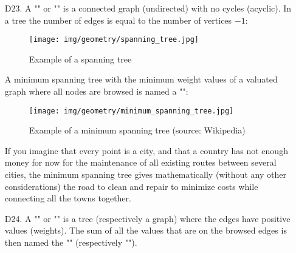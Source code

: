 {\begin{enumerate}
	\item[D23.] A "" or "" is a connected graph (undirected) with no cycles (acyclic). In a tree the number of edges is equal to the number of vertices $- 1$:
	 \begin{figure}[H]
		\centering
		\texttt{[image: img/geometry/spanning\_tree.jpg]}
		\caption{Example of a spanning tree}
	\end{figure}
	 A minimum spanning tree with the minimum weight values of a valuated graph where all nodes are browsed is named a "":
	 \begin{figure}[H]
		\centering
		\texttt{[image: img/geometry/minimum\_spanning\_tree.jpg]}
		\caption[Example of a minimum spanning tree]{Example of a minimum spanning tree (source: Wikipedia)}
	\end{figure}
	If you imagine that every point is a city, and that a country has not enough money for now for the maintenance of all existing routes between several cities, the minimum spanning tree gives mathematically (without any other considerations) the road to clean and repair to minimize costs while connecting all the towns together.
	
	\item[D24.] A "" or "" is a tree (respectively a graph) where the edges have positive values (weights). The sum of all the values that are on the browsed edges is then named the "" (respectively "").
	

\end{enumerate}}
